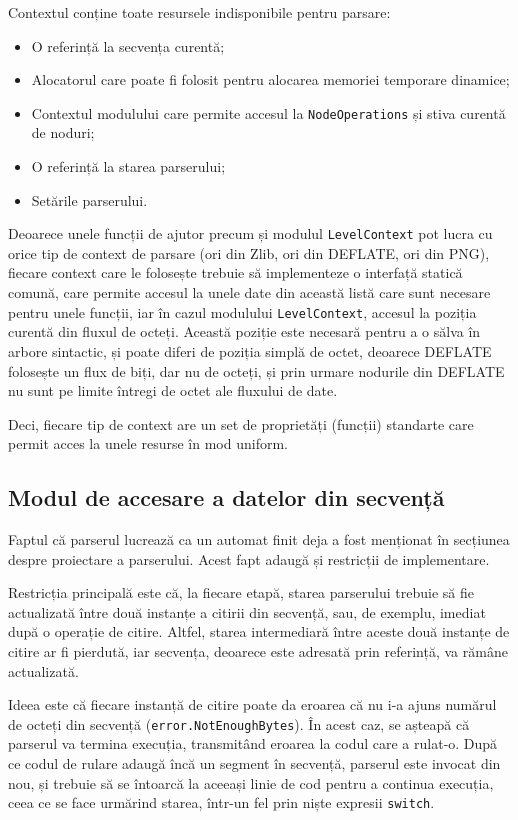 \documentclass[a4paper,12pt]{report}
\begin{document}
Contextul conține toate resursele indisponibile pentru parsare:
\begin{itemize}
    \item O referință la secvența curentă;
    \item Alocatorul care poate fi folosit pentru alocarea memoriei temporare dinamice;
    \item Contextul modulului care permite accesul la \texttt{NodeOperations} și stiva curentă de noduri;
    \item O referință la starea parserului;
    \item Setările parserului.
\end{itemize}

Deoarece unele funcții de ajutor precum și modulul \texttt{LevelContext}
pot lucra cu orice tip de context de parsare (ori din Zlib, ori din DEFLATE, ori din \ac{PNG}),
fiecare context care le folosește trebuie să implementeze o interfață statică comună,
care permite accesul la unele date din această listă care sunt necesare pentru unele funcții,
iar în cazul modulului \texttt{LevelContext},
accesul la poziția curentă din fluxul de octeți.
Această poziție este necesară pentru a o sălva în arbore sintactic,
și poate diferi de poziția simplă de octet,
deoarece DEFLATE folosește un flux de biți, dar nu de octeți,
și prin urmare nodurile din DEFLATE nu sunt pe limite întregi de octet ale fluxului de date.

Deci, fiecare tip de context are un set de proprietăți (funcții) standarte
care permit acces la unele resurse în mod uniform.

\subsection{Modul de accesare a datelor din secvență}

Faptul că parserul lucrează ca un automat finit deja a fost
menționat în secțiunea despre proiectare a parserului.
Acest fapt adaugă și restricții de implementare.

Restricția principală este că, la fiecare etapă, starea parserului trebuie să fie actualizată
între două instanțe a citirii din secvență, sau, de exemplu, imediat după o operație de citire.
Altfel, starea intermediară între aceste două instanțe de citire ar fi pierdută,
iar secvența, deoarece este adresată prin referință, va rămâne actualizată.

Ideea este că fiecare instanță de citire poate da eroarea
că nu i-a ajuns numărul de octeți din secvență (\texttt{error.NotEnoughBytes}).
În acest caz, se așteapă că parserul va termina execuția,
transmitând eroarea la codul care a rulat-o.
După ce codul de rulare adaugă încă un segment în secvență,
parserul este invocat din nou, și trebuie să se întoarcă
la aceeași linie de cod pentru a continua execuția,
ceea ce se face urmărind starea, într-un fel prin niște expresii \texttt{switch}.
\end{document}
